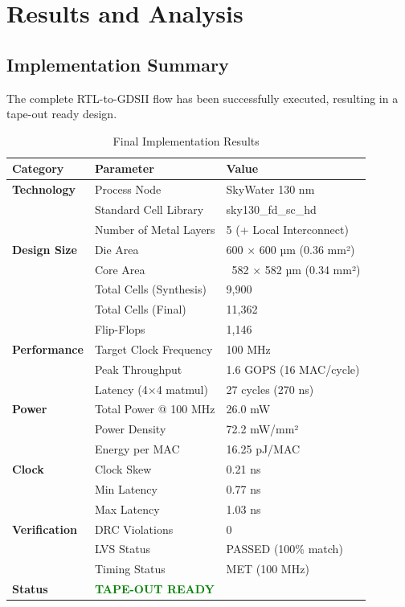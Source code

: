 \documentclass[12pt,a4paper]{article}
\begin{document}
\newpage

\section{Results and Analysis}

\subsection{Implementation Summary}

The complete RTL-to-GDSII flow has been successfully executed, resulting in a tape-out ready design.

\begin{table}[H]
\centering
\caption{Final Implementation Results}
\label{tab:final_results}
\begin{tabular}{@{}lll@{}}
\toprule
\textbf{Category} & \textbf{Parameter} & \textbf{Value} \\
\midrule
\textbf{Technology} & Process Node & SkyWater 130 nm \\
& Standard Cell Library & sky130\_fd\_sc\_hd \\
& Number of Metal Layers & 5 (+ Local Interconnect) \\
\midrule
\textbf{Design Size} & Die Area & 600 × 600 µm (0.36 mm²) \\
& Core Area & ~582 × 582 µm (0.34 mm²) \\
& Total Cells (Synthesis) & 9,900 \\
& Total Cells (Final) & 11,362 \\
& Flip-Flops & 1,146 \\
\midrule
\textbf{Performance} & Target Clock Frequency & 100 MHz \\
& Peak Throughput & 1.6 GOPS (16 MAC/cycle) \\
& Latency (4×4 matmul) & 27 cycles (270 ns) \\
\midrule
\textbf{Power} & Total Power @ 100 MHz & 26.0 mW \\
& Power Density & 72.2 mW/mm² \\
& Energy per MAC & 16.25 pJ/MAC \\
\midrule
\textbf{Clock} & Clock Skew & 0.21 ns \\
& Min Latency & 0.77 ns \\
& Max Latency & 1.03 ns \\
\midrule
\textbf{Verification} & DRC Violations & 0 \\
& LVS Status & PASSED (100\% match) \\
& Timing Status & MET (100 MHz) \\
\midrule
\textbf{Status} & \multicolumn{2}{l}{\textcolor{green}{\textbf{TAPE-OUT READY}}} \\
\bottomrule
\end{tabular}
\end{table}
\end{document}
